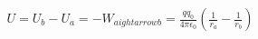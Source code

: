 \documentclass[preview]{standalone}
\begin{document}
\begin{align*}
U = U_b - U_a = - W_{a 
ightarrow b} = \frac{q q_0}{4 \pi \epsilon_0} \left( \frac{1}{r_a} - \frac{1}{r_b} \right)
\end{align*}
\end{document}
